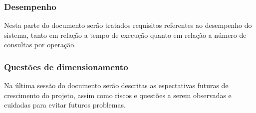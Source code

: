 \subsubsection{Desempenho}

Nesta parte do documento serão tratados requisitos referentes ao desempenho do sistema, tanto em relação a tempo de execução quanto em relação a número de consultas por operação.

\subsubsection{Questões de dimensionamento}

Na última sessão do documento serão descritas as espectativas futuras de crescimento do projeto, assim como riscos e questões a serem observadas e cuidadas para evitar futuros problemas.